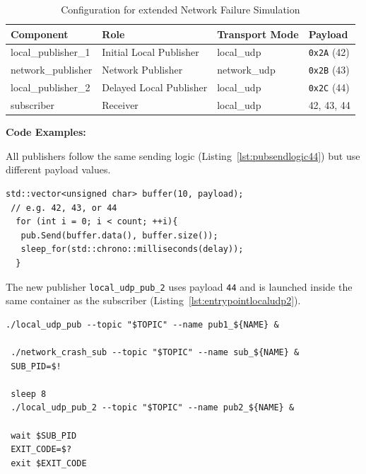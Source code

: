 \begin{table}[H]
	\centering
	\begin{tabular}{@{}llll@{}}
		\toprule
		\textbf{Component} & \textbf{Role} & \textbf{Transport Mode} & \textbf{Payload} \\
		\midrule
		local\_publisher\_1 & Initial Local Publisher & local\_udp & \texttt{0x2A} (42) \\
		network\_publisher & Network Publisher & network\_udp & \texttt{0x2B} (43) \\
		local\_publisher\_2 & Delayed Local Publisher & local\_udp & \texttt{0x2C} (44) \\
		subscriber & Receiver & local\_udp & 42, 43, 44 \\
		\bottomrule
	\end{tabular}
	\caption{Configuration for extended Network Failure Simulation}
	\label{tab:network_failure_sim_44}
\end{table}

\vspace{0.4em}
\textbf{Code Examples:}

\vspace{0.4em}
All publishers follow the same sending logic (Listing~\ref{lst:pubsendlogic44}) but use different payload values.

\begin{lstlisting}[style=cppstyle, caption={General publisher loop}, label={lst:pubsendlogic44}, captionpos=b]
 std::vector<unsigned char> buffer(10, payload); 
 // e.g. 42, 43, or 44
  for (int i = 0; i < count; ++i){
   pub.Send(buffer.data(), buffer.size());
   sleep_for(std::chrono::milliseconds(delay));
  }
\end{lstlisting}

\vspace{0.4em}
The new publisher \texttt{local\_udp\_pub\_2} uses payload \texttt{44} and is launched inside the same container as the subscriber (Listing~\ref{lst:entrypointlocaludp2}).

\begin{lstlisting}[style=cppstyle, caption={Entrypoint launches second local publisher after delay}, label={lst:entrypointlocaludp2}, captionpos=b]
 ./local_udp_pub --topic "$TOPIC" --name pub1_${NAME} &
 
 ./network_crash_sub --topic "$TOPIC" --name sub_${NAME} &
 SUB_PID=$!
 
 sleep 8
 ./local_udp_pub_2 --topic "$TOPIC" --name pub2_${NAME} &
 
 wait $SUB_PID
 EXIT_CODE=$?
 exit $EXIT_CODE
\end{lstlisting}

